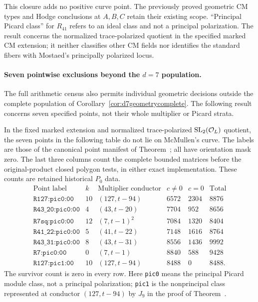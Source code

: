 \begin{remark}
This closure adds no positive curve point.  The previously proved
geometric CM types and Hodge conclusions at $A,B,C$ retain their
existing scope.  ``Principal Picard class'' for $R_{41}$ refers to
an ideal class and not a principal polarization.  The result concerns
the normalized trace-polarized quotient in the specified marked CM
extension; it neither classifies other CM fields nor identifies the
standard fibers with Mostaed's principally polarized locus.
\end{remark}

\paragraph{Seven pointwise exclusions beyond the $d=7$ population.}
The full arithmetic census also permits individual geometric decisions
outside the complete population of Corollary~\ref{cor:d7geometrycomplete}.
The following result concerns seven specified points, not their whole
multiplier or Picard strata.

\begin{proposition}
\label{prop:broadersevenexclusions}
In the fixed marked extension and normalized trace-polarized
$\operatorname{SL}_2(\mathcal O_L)$ quotient, the seven points in the following table do not
lie on McMullen's curve. The labels are those of the canonical point
manifest of Theorem~; all have orientation
mask zero. The last three columns count the complete bounded matrices
before the original-product closed polygon tests, in either exact
implementation. These counts are retained historical $P_0$ data.
\[
\begin{array}{l|r|l|r|r|r}
\text{Point label}&k&\text{Multiplier conductor}&c\ne0&c=0&\text{Total}\\\hline
\texttt{R127:pic0:00}&10&(127,t-94)&6572&2304&8876\\
\texttt{R43\_20:pic0:00}&4&(43,t-20)&7704&952&8656\\
\texttt{R7sq:pic0:00}&12&(7,t-1)^2&7084&1320&8404\\
\texttt{R41\_22:pic0:00}&5&(41,t-22)&7148&1616&8764\\
\texttt{R43\_31:pic0:00}&8&(43,t-31)&8556&1436&9992\\
\texttt{R7:pic0:00}&0&(7,t-1)&8840&588&9428\\
\texttt{R127:pic1:00}&10&(127,t-94)&8488&0&8488.
\end{array}
\]
The survivor count is zero in every row. Here \texttt{pic0} means the
principal Picard module class, not a principal polarization;
\texttt{pic1} is the nonprincipal class represented at conductor
$(127,t-94)$ by $J_9$ in the proof of
Theorem~.
\end{proposition}

